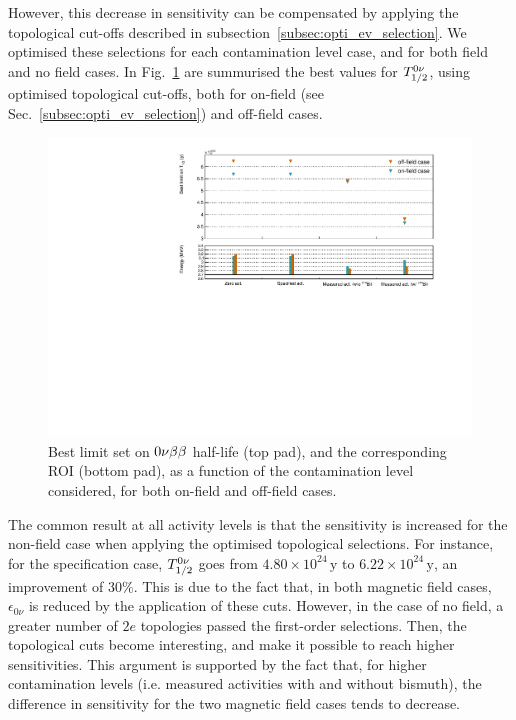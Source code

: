 However, this decrease in sensitivity can be compensated by applying the topological cut-offs described in subsection~\ref{subsec:opti_ev_selection}.
We optimised these selections for each contamination level case, and for both field and no field cases.
In Fig.~\ref{fig:sensitivity_B} are summurised the best values for $T_{1/2}^{0\nu}$, using optimised topological cut-offs, both for on-field (see Sec.~\ref{subsec:opti_ev_selection}) and off-field cases.
\begin{figure}[h]
  \centering
  \includegraphics[width=1.1\textwidth]{Sensitivity/fig_sensitivity/contamination_Se_w_woB.pdf}
  \caption{Best limit set on $0\nu\beta\beta$ half-life (top pad), and the corresponding ROI (bottom pad), as a function of the contamination level considered, for both on-field and off-field cases.
    \label{fig:sensitivity_B}}
\end{figure}
The common result at all activity levels is that the sensitivity is increased for the non-field case when applying the optimised topological selections.
For instance, for the specification case, $T_{1/2}^{0\nu}$ goes from $4.80\times 10^{24}\,\text{y}$ to $6.22\times 10^{24}\,\text{y}$, an improvement of $30\%$.
This is due to the fact that, in both magnetic field cases, $\epsilon_{0\nu}$ is reduced by the application of these cuts.
However, in the case of no field, a greater number of $2e$ topologies passed the first-order selections.
Then, the topological cuts become interesting, and make it possible to reach higher sensitivities.
This argument is supported by the fact that, for higher contamination levels (i.e. measured activities with and without bismuth), the difference in sensitivity for the two magnetic field cases tends to decrease.

